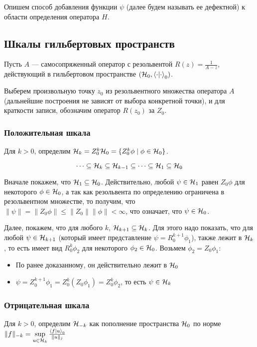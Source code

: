 
Опишем способ добавления функции $\psi$ (далее будем называть ее дефектной) к области определения оператора $H$.

\subsection{Шкалы гильбертовых пространств}
Пусть $A$ — самосопряженный оператор с резольвентой $R(z) = \frac{1}{A - z}$, действующий в гильбертовом пространстве $(\hilb{0}, \ipcdot_0)$.

Выберем произвольную точку $z_0$ из резольвентного множества оператора $A$ (дальнейшие построения не зависят от выбора конкретной точки), и для краткости записи, обозначим оператор $R(z_0)$ за $Z_0$.

\subsubsection{Положительная шкала}
Для $k > 0$, определим $\mathcal{H}_{k} = Z_0^k \mathcal{H}_{0} = \{ Z_0^k \phi \mid \phi \in \mathcal{H}_{0} \}$.

\begin{prop}
\[
\dots \subseteq \mathcal{H}_{k} \subseteq \mathcal{H}_{k - 1} \subseteq \dots \subseteq \mathcal{H}_{1} \subseteq{\mathcal{H}_{0}}
\]
\end{prop}
Вначале покажем, что $\mathcal{H}_{1} \subseteq \mathcal{H}_{0}$. Действительно, любой $\psi \in \mathcal{H}_{1}$ равен $Z_0 \phi$ для некоторого $\phi \in \mathcal{H}_{0}$, а так как резольвента по определению ограничена в резольвентном множестве, то получим, что $\| \psi \| = \| Z_0 \phi \| \le \|Z_0\| \|\phi\| < \infty$, что означает, что $\psi \in \mathcal{H}_{0}$.

Далее, покажем, что для любого $k$, $\mathcal{H}_{k + 1} \subseteq \mathcal{H}_{k}$. Для этого надо показать, что для любой $\psi \in \mathcal{H}_{k + 1}$ (который имеет представление $\psi = R_0^{k + 1} \phi_1$), также лежит в $\mathcal{H}_{k}$, то есть имеет вид $R_0^k \phi_2$ для некоторого $\phi_2 \in \mathcal{H}_{0}$. Возьмем $\phi_2 = Z_0 \phi_1$:
\begin{itemize}
\item По ранее доказанному, он действительно лежит в $\mathcal{H}_{0}$
\item $\psi = Z_0^{k + 1} \phi_1 = Z_0^k (Z_0 \phi_1) = Z_0^k \phi_2$, то есть $\psi \in \mathcal{H}_{k}$
\end{itemize}

\subsubsection{Отрицательная шкала}
Для $k > 0$, определим $\mathcal{H}_{-k}$ как пополнение пространства $\mathcal{H}_{0}$ по норме $\|f \|_{-k} = \sup\limits_{u \in \hilb{k}} \frac{\ip{f}{u}_0}{\|u\|_j}$


